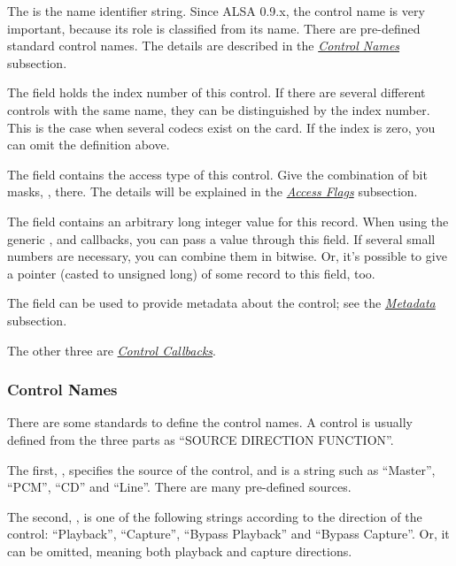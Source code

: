 \documentclass[a4paper,8pt,english]{sphinxmanual}
\begin{document}
The  is the name identifier string. Since ALSA 0.9.x, the
control name is very important, because its role is classified from
its name. There are pre-defined standard control names. The details
are described in the {\hyperref[sound/kernel\string-api/writing\string-an\string-alsa\string-driver:control\string-names]{\emph{Control Names}}} subsection.

The  field holds the index number of this control. If there
are several different controls with the same name, they can be
distinguished by the index number. This is the case when several
codecs exist on the card. If the index is zero, you can omit the
definition above.

The  field contains the access type of this control. Give
the combination of bit masks, ,
there. The details will be explained in the {\hyperref[sound/kernel\string-api/writing\string-an\string-alsa\string-driver:access\string-flags]{\emph{Access Flags}}}
subsection.

The  field contains an arbitrary long integer value
for this record. When using the generic ,  and 
callbacks, you can pass a value through this field. If several small
numbers are necessary, you can combine them in bitwise. Or, it's
possible to give a pointer (casted to unsigned long) of some record to
this field, too.

The  field can be used to provide metadata about the control;
see the {\hyperref[sound/kernel\string-api/writing\string-an\string-alsa\string-driver:metadata]{\emph{Metadata}}} subsection.

The other three are {\hyperref[sound/kernel\string-api/writing\string-an\string-alsa\string-driver:control\string-callbacks]{\emph{Control Callbacks}}}.


\subsubsection{Control Names}
\label{sound/kernel-api/writing-an-alsa-driver:control-names}
There are some standards to define the control names. A control is
usually defined from the three parts as “SOURCE DIRECTION FUNCTION”.

The first, , specifies the source of the control, and is a
string such as “Master”, “PCM”, “CD” and “Line”. There are many
pre-defined sources.

The second, , is one of the following strings according to
the direction of the control: “Playback”, “Capture”, “Bypass Playback”
and “Bypass Capture”. Or, it can be omitted, meaning both playback and
capture directions.
\end{document}
